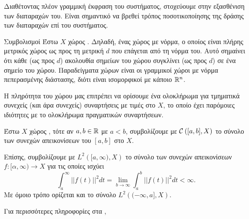 Διαθέτοντας πλέον γραμμική έκφραση του συστήματος, στοχεύουμε στην εξασθένιση 
των διαταραχών του. Είναι σημαντικό να βρεθεί τρόπος ποσοτικοποίησης της δράσης
των διαταραχών επί του συστήματος.  


\begin{nameddefn}{Συμβολισμοί}
    Έστω $X$ χώρος . Δηλαδή, ένας χώρος με νόρμα, ο οποίος είναι 
    πλήρης μετρικός χώρος ως προς τη μετρική $d$ που επάγεται από τη νόρμα του.
    Αυτό σημαίνει ότι κάθε  (ως προς $d$) ακολουθία σημείων του 
    χώρου συγκλίνει (ως προς $d$) σε ένα σημείο του χώρου. Παραδείγματα χώρων 
     είναι οι γραμμικοί χώροι με νόρμα πεπερασμένης διάστασης, διότι 
    είναι ισομορφικοί με κάποιο $\mathbb{R}^{n}$.
    
    Η πληρότητα του χώρου μας επιτρέπει να ορίσουμε ένα ολοκλήρωμα για τμηματικά
    συνεχείς (και άρα συνεχείς) συναρτήσεις με τιμές στο $X$, το οποίο έχει 
    παρόμοιες ιδιότητες με το ολοκλήρωμα  πραγματικών συναρτήσεων. 
    
    Έστω $X$ χώρος , τότε αν $a, b \in \mathbb{R}$ με $a <b$, 
    συμβολίζουμε με $\mathcal{C}^{} \left([a,b],X\right)$ το σύνολο των συνεχών 
    απεικονίσεων του $[a, b]$ στο $X$.
    
    Επίσης, συμβολίζουμε με $L^2\left([a, \infty),X\right)$ το σύνολο των 
    συνεχών απεικονίσεων $f:[\alpha,\infty)\rightarrow X$ για τις οποίες ισχύει
    \begin{equation*}
        \int_{a}^{\infty} ||f(t)||^2 dt = \lim_{b\rightarrow \infty}\int_{a}^{b} 
        ||f(t)||^2 dt < \infty.
    \end{equation*}
    Με όμοιο τρόπο ορίζεται και το σύνολο $L^2\left((-\infty,a],X\right)$.

    Για περισσότερες πληροφορίες στα \cite{Amann2005}, \cite{Lang1997}
\end{nameddefn}

